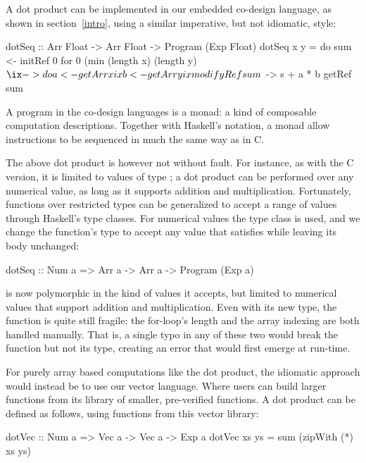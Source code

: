 \documentclass[../paper.tex]{subfiles}
\begin{document}
A dot product can be implemented in our embedded co-design language, as shown in section~\ref{intro}, using a similar imperative, but not idiomatic, style:

\begin{code}
dotSeq :: Arr Float -> Arr Float -> Program (Exp Float)
dotSeq x y = do
  sum <- initRef 0
  for 0 (min (length x) (length y) $ \ix -> do
    a <- getArr x ix
    b <- getArr y ix
    modifyRef sum $ \s -> s + a * b
  getRef sum
\end{code}

\noindent A program in the co-design languages is a monad: a kind of composable computation descriptions. Together with Haskell's  notation, a monad allow instructions to be sequenced in much the same way as in C.

The above dot product is however not without fault. For instance, as with the C version, it is limited to values of type ; a dot product can be performed over any numerical value, as long as it supports addition and multiplication. Fortunately, functions over restricted types can be generalized to accept a range of values through Haskell's type classes. For numerical values the type class  is used, and we change the function's type to accept any value that satisfies  while leaving its body unchanged:

\begin{code}
dotSeq :: Num a => Arr a -> Arr a -> Program (Exp a)
\end{code}

\noindent {} is now polymorphic in the kind of values it accepts, but limited to numerical values that support addition and multiplication. Even with its new type, the function is quite still fragile: the for-loop's length and the array indexing are both handled manually. That is, a single typo in any of these two would break the function but not its type, creating an error that would first emerge at run-time.

For purely array based computations like the dot product, the idiomatic approach would instead be to use our vector language. Where users can build larger functions from its library of smaller, pre-verified functions. A dot product can be defined as follows, using functions from this vector library:

\begin{code}
dotVec :: Num a => Vec a -> Vec a -> Exp a
dotVec xs ys = sum (zipWith (*) xs ys)
\end{code}
\end{document}
